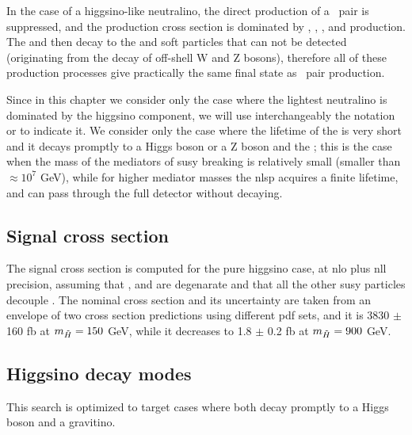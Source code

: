 In the case of a higgsino-like neutralino, the direct production of a \ninoone\ninoone\ pair is suppressed, and the production cross section is dominated by 
\ninoone\ninotwo, \ninoone\chinoonepm, \ninotwo\chinoonepm, and \chinoonep\chinoonem production.
The \ninotwo and \chinoonepm then decay to the \ninoone and soft particles that can not be detected (originating from the 
decay of off-shell W and Z bosons), therefore all of these production processes give practically the same final state as 
\ninoone\ninoone\  pair production. 

Since in this chapter we consider only the case where the lightest neutralino is dominated by the higgsino component,
we will use interchangeably the notation \ninoone or \hino to indicate it.  
We consider only the case where the lifetime of the \hino is very short and it decays promptly to a Higgs boson or a Z boson and the \gravino;
this is the case when the mass of the mediators of \gls{susy} breaking is relatively small (smaller than $\approx 10^7$ GeV), 
while for higher mediator masses the \gls{nlsp} acquires a finite lifetime, and can pass through the full detector without decaying. 


\subsection{Signal cross section}

The signal cross section is computed for the pure higgsino case, at \gls{nlo} plus \gls{nll} precision, assuming that
\ninoone, \ninotwo and \chinoonepm are degenarate and that all the other \gls{susy} particles decouple \cite{Fuks:2012qx,Fuks:2013vua}.
The nominal cross section and its uncertainty are taken from an envelope of two cross section predictions using different \gls{pdf} sets, 
and it is 3830 $\pm$ 160 fb at $m_{\tilde{H}} = 150$ GeV, while it decreases to 1.8 $\pm$ 0.2 fb at $m_{\tilde{H}} = 900$ GeV. 

\subsection{Higgsino decay modes}

This search is optimized to target cases where both \hino decay promptly to a Higgs boson and a gravitino. 





